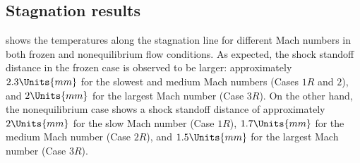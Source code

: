 \subsection{Stagnation results}
 shows the temperatures along the stagnation
line for different Mach numbers in both frozen and nonequilibrium flow
conditions. As expected, the shock standoff distance in the frozen case is
observed to be larger: approximately $2.3\Units{mm}$ for the slowest and medium
Mach numbers (Cases $1R$ and $2$), and $2\Units{mm}$ for the largest Mach
number (Case $3R$). On the other hand, the nonequilibrium case shows a shock
standoff distance of approximately $2\Units{mm}$ for the slow Mach number (Case
$1R$), $1.7\Units{mm}$ for the medium Mach number (Case $2R$), and
$1.5\Units{mm}$ for the largest Mach number (Case $3R$).\\


